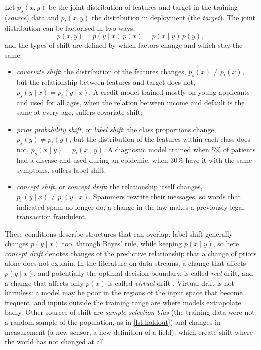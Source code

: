 Let $p_s(x,y)$ be the joint distribution of features and target in the training (\emph{source}) data and
$p_t(x,y)$ the distribution in deployment (the \emph{target}). The joint distribution can be factorised in
two ways,
\begin{equation}
  p(x,y)=p(y\mid x)\,p(x)=p(x\mid y)\,p(y),
\end{equation}
and the types of shift are defined by which factors change and which stay the same:
\begin{itemize}
  \item \emph{covariate shift}: the distribution of the features changes, $p_s(x)\neq p_t(x)$, but the
        relationship between features and target does not, $p_s(y\mid x)=p_t(y\mid x)$. A credit model
        trained mostly on young applicants and used for all ages, when the relation between income and
        default is the same at every age, suffers covariate shift;
  \item \emph{prior probability shift}, or \emph{label shift}: the class proportions change,
        $p_s(y)\neq p_t(y)$, but the distribution of the features within each class does not,
        $p_s(x\mid y)=p_t(x\mid y)$. A diagnostic model trained when 5\% of patients had a disease and used
        during an epidemic, when 30\% have it with the same symptoms, suffers label shift;
  \item \emph{concept shift}, or \emph{concept drift}: the relationship itself changes,
        $p_s(y\mid x)\neq p_t(y\mid x)$. Spammers rewrite their messages, so words that indicated spam
        no longer do; a change in the law makes a previously legal transaction fraudulent.
\end{itemize}
These conditions describe structures that can overlap: label shift generally
changes $p(y\mid x)$ too, through Bayes' rule, while keeping $p(x\mid y)$, so here \emph{concept drift} denotes
changes of the predictive relationship that a change of priors alone does not explain.
In the literature on data streams, a change that affects $p(y\mid x)$, and potentially the optimal
decision boundary, is called \emph{real} drift, and a change that affects only $p(x)$ is called \emph{virtual} drift
\citep{gama2014survey}. Virtual drift is not harmless: a model may be poor in the regions of the input space
that become frequent, and inputs outside the training range are where models extrapolate badly. Other
sources of shift are \emph{sample selection bias} (the training data were not a random sample of the
population, as in \cref{lst:holdout}) and changes in measurement (a new sensor, a new definition of a field),
which create shift where the world has not changed at all.

